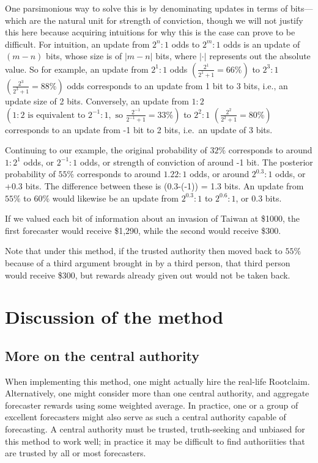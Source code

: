 \documentclass[]{article}
\begin{document}
One parsimonious way to solve this is by denominating updates in terms
of bits---which are the natural unit for strength of conviction, though
we will not justify this here because acquiring intuitions for why this
is the case can prove to be difficult. For intuition, an update from
\(2^{n}:1\) odds to \(2^{m}:1\) odds is an update of \((m-n)\) bits,
whose size is of \(|m-n|\) bits, where \(|\cdot|\) represents out the
absolute value. So for example, an update from \(2^1:1\) odds
\(\left(\frac{2^1}{2^1 + 1} = 66\%\right)\) to \(2^3:1\)
\(\left(\frac{2^3}{2^3 + 1} = 88\%\right)\) odds corresponds to an
update from 1 bit to 3 bits, i.e., an update size of 2 bits. Conversely,
an update from \(1:2\)
\(\left(1:2 \text{ is equivalent to } 2^{-1}:1, \text{ so } \frac{2^{-1}}{2^{-1} + 1} = 33\%\right)\)
to \(2^{2}:1\) \(\left(\frac{2^2}{2^2 + 1} = 80\%\right)\) corresponds
to an update from -1 bit to 2 bits, i.e.~an update of 3 bits.

Continuing to our example, the original probability of \(32\%\)
corresponds to around \(1:2^1\) odds, or \(2^{-1}:1\) odds, or strength
of conviction of around -1 bit. The posterior probability of \(55\%\)
corresponds to around \(1.22 : 1\) odds, or around \(2^{0.3} : 1\) odds,
or +0.3 bits. The difference between these is (0.3-(-1)) = 1.3 bits. An
update from \(55\%\) to \(60\%\) would likewise be an update from
\(2^{0.3}:1\) to \(2^{0.6}:1\), or 0.3 bits.

If we valued each bit of information about an invasion of Taiwan at
\$1000, the first forecaster would receive \$1,290, while the second
would receive \$300.

Note that under this method, if the trusted authority then moved back to
\(55\%\) because of a third argument brought in by a third person, that
third person would receive \$300, but rewards already given out would
not be taken back.

\hypertarget{discussion-of-the-method}{%
\section{Discussion of the method}\label{discussion-of-the-method}}

\hypertarget{more-on-the-central-authority}{%
\subsection{More on the central
authority}\label{more-on-the-central-authority}}

When implementing this method, one might actually hire the real-life
Rootclaim. Alternatively, one might consider more than one central
authority, and aggregate forecaster rewards using some weighted average.
In practice, one or a group of excellent forecasters might also serve as
such a central authority capable of forecasting. A central authority
must be trusted, truth-seeking and unbiased for this method to work
well; in practice it may be difficult to find authoriities that are
trusted by all or most forecasters.
\end{document}
